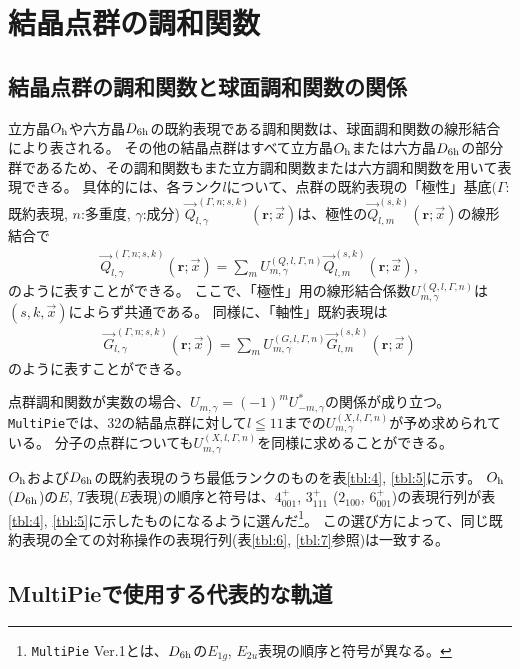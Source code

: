 \documentclass[11pt]{easymemo}
\begin{document}
\section{結晶点群の調和関数}

\subsection{結晶点群の調和関数と球面調和関数の関係}

立方晶$O_{\rm h}$や六方晶$D_{\rm 6h}$の既約表現である調和関数は、球面調和関数の線形結合により表される。
その他の結晶点群はすべて立方晶$O_{\rm h}$または六方晶$D_{\rm 6h}$の部分群であるため、その調和関数もまた立方調和関数または六方調和関数を用いて表現できる。
具体的には、各ランク$l$について、点群の既約表現の「極性」基底$(\Gamma$:既約表現, $n$:多重度, $\gamma$:成分) $\vec{Q}_{l,\gamma}^{\,(\Gamma,n;s,k)}(\bm{r};\vec{x})$は、極性の$\vec{Q}_{l,m}^{(s,k)}(\bm{r};\vec{x})$の線形結合で
\begin{align}
\vec{Q}_{l,\gamma}^{\,(\Gamma,n;s,k)}(\bm{r};\vec{x})=\sum_m U_{m,\gamma}^{(Q,l,\Gamma,n)} \vec{Q}_{l,m}^{(s,k)}(\bm{r};\vec{x}),
\label{eq:mullinear}
\end{align}
のように表すことができる。
ここで、「極性」用の線形結合係数$U_{m,\gamma}^{(Q,l,\Gamma,n)}$は$(s,k,\vec{x})$によらず共通である。
同様に、「軸性」既約表現は
\begin{align}
\vec{G}_{l,\gamma}^{\,(\Gamma,n;s,k)}(\bm{r};\vec{x})=\sum_m U_{m,\gamma}^{(G,l,\Gamma,n)} \vec{G}_{l,m}^{(s,k)}(\bm{r};\vec{x})
\end{align}
のように表すことができる。

点群調和関数が実数の場合、$U_{m,\gamma}=(-1)^m U_{-m,\gamma}^*$の関係が成り立つ。
\texttt{MultiPie}では、32の結晶点群に対して$l\leqq 11$までの$U_{m,\gamma}^{(X,l,\Gamma,n)}$が予め求められている。
分子の点群についても$U_{m,\gamma}^{(X,l,\Gamma,n)}$を同様に求めることができる。

$O_{\rm h}$および$D_{\rm 6h}$の既約表現のうち最低ランクのものを表\ref{tbl:4}, \ref{tbl:5}に示す。
$O_{\rm h}$ ($D_{\rm 6h}$)の$E$, $T$表現($E$表現)の順序と符号は、$4_{001}^{+}$, $3_{111}^{+}$ ($2_{100}$, $6_{001}^{+}$)の表現行列が表\ref{tbl:4}, \ref{tbl:5}に示したものになるように選んだ\footnote{{\tt MultiPie} Ver.1とは、$D_{\rm 6h}$の$E_{1g}$, $E_{2u}$表現の順序と符号が異なる。}。
この選び方によって、同じ既約表現の全ての対称操作の表現行列(表\ref{tbl:6}, \ref{tbl:7}参照)は一致する。


\subsection{MultiPieで使用する代表的な軌道}
\end{document}
